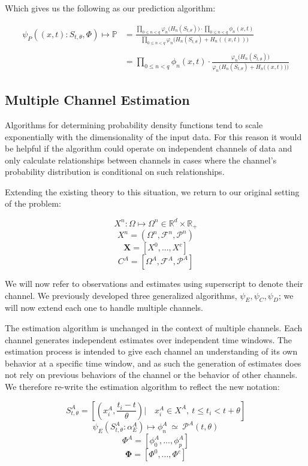 \documentclass[10pt]{article}
\begin{document}
Which gives us the following as our prediction algorithm:

\begin{align}
\psi_P \left( (x,t) :S_{t,\theta}, \Phi \right) \mapsto \mathbb{P} 
	&= \frac{ \prod_{0 \le n < q} \varphi_n \big( H_n(S_{t,\theta}) \big) \cdot \prod_{0 \le n < q} \phi_n(x,t) }{ \prod_{0 \le n < q} \varphi_n \big( H_n(S_{t,\theta}) + H_n((x,t)) \big) }  \nonumber \\
\nonumber \\
&= \label{eq:predSingle} \prod_{0 \le n < q} \phi_n(x,t) \cdot \frac{ \varphi_n \Big( H_n(S_{t,\theta}) \Big) }{ \varphi_n \Big( H_n(S_{t,\theta}) + H_n\big((x,t)\big) \Big) }
\end{align}


\subsection{Multiple Channel Estimation}
Algorithms for determining probability density functions tend to scale exponentially with the dimensionality of the input data.  For this reason it would be helpful if the algorithm could operate on independent channels of data and only calculate relationships between channels in cases where the channel's probability distribution is conditional on such relationships.

Extending the existing theory to this situation, we return to our original setting of the problem:

\[ X^n : \Omega \mapsto \Omega^n \in \mathbb{R}^d \times \mathbb{R}_+ \]
\[ X^n = (\Omega^n,\mathcal{F}^n,\mathcal{P}^n) \]
\[ \mathbf{X} = [X^0,...,X^c]   \]
\[ C^A = [\Omega^A,\mathcal{F}^A,\mathcal{P}^A] \]


We will now refer to observations and estimates using superscript to denote their channel.  We previously developed three generalized algorithms, \(\psi_E, \psi_C, \psi_D \); we will now extend each one to handle multiple channels.

The estimation algorithm is unchanged in the context of multiple channels.  Each channel generates independent estimates over independent time windows.  The estimation process is intended to give each channel an understanding of its own behavior at a specific time window, and as such the generation of estimates does not rely on previous behaviors of the channel or the behavior of other channels.  We therefore re-write the estimation algorithm to reflect the new notation:

\begin{equation} S_{t,\theta}^A = \left[ \left( x_i^A,\frac{t_i - t}{\theta} \right) | \quad x_i^A \in X^A, \ t \le t_i < t + \theta \right] \end{equation}
\begin{equation} \label{eq:phiMulti} \psi_E( S_{t,\theta}^A:\alpha_E^A ) \mapsto \phi_n^A \ \simeq \ \mathcal{P}^A(t,\theta)  \end{equation}
\[ \Phi^A = [\phi_0^A,...,\phi_p^A ] \nonumber \]
\[ \boldsymbol{\Phi} = [\Phi^0,...,\Phi^c] \]
\end{document}

